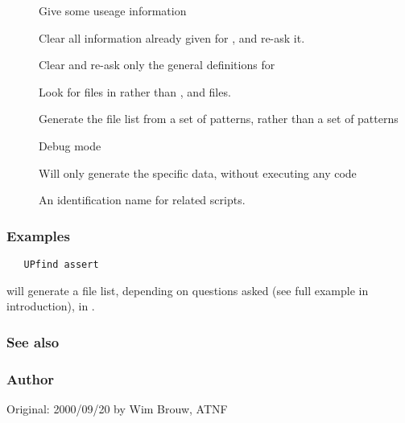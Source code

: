 \begin{description}
\item[]
    Give some useage information
\item[]
    Clear all information already given for , and re-ask it.
\item[]
    Clear and re-ask only the general definitions for 
\item[]
    Look for files in  rather than ,  and
     files.
\item[]
    Generate the file list from a set of  patterns, rather than a set of
     patterns
\item[]
    Debug mode
\item[]
    Will only generate the specific data, without executing any code
\item[]
    An identification name for related  scripts.
\end{description}

\subsubsection*{Examples}

\begin{verbatim}
   UPfind assert
\end{verbatim}

will generate a file list, depending on questions asked (see full example in
introduction), in .

\subsubsection*{See also}

\subsubsection*{Author}

Original: 2000/09/20 by Wim Brouw, ATNF


\newpage

\subsection{}
\label{UPchange}

